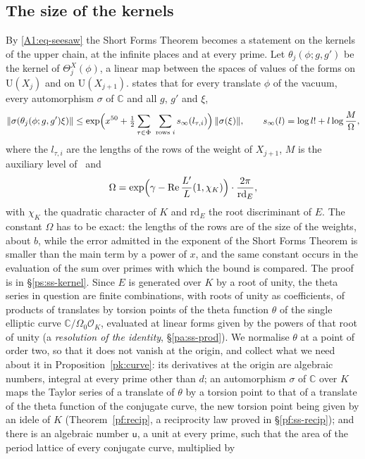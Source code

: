 \documentclass[10pt]{amsart}
\theoremstyle{definition}
\theoremstyle{remark}
\newcommand{\C}{\mathbb C}
\newcommand{\Rel}{\operatorname{Re}}
\providecommand{\auO}{\mathcal O}
\providecommand{\auPl}{\Phi}
\providecommand{\auU}{\mathrm U}
\providecommand{\auchi}{\chi_K}
\providecommand{\aurd}{\mathrm{rd}_E}
\providecommand{\ausinf}{s_\infty}
\begin{document}
\subsection*{The size of the kernels}
By \eqref{A1:eq-seesaw} the Short Forms Theorem becomes a statement on the kernels of the upper
chain, at the infinite places and at every prime. Let $\theta_j(\phi;g,g')$ be the kernel of
$\Theta^X_j(\phi)$, a linear map between the spaces of values of the forms on $\auU(X_j)$ and on
$\auU(X_{j+1})$. {\cite[Proposition~14.23]{P46}} states that for every translate $\phi$ of the
vacuum, every automorphism $\sigma$ of $\C$ and all $g$, $g'$ and $\xi$,
\[
\|\sigma(\theta_j(\phi;g,g')\xi)\|\le\exp\Bigl(x^{50}+\tfrac12\sum_{\tau\in\auPl}\
\sum_{\text{rows }i}\ausinf(l_{\tau,i})\Bigr)\,\|\sigma(\xi)\|,\qquad
\ausinf(l)=\log l!+l\log\frac M\Omega,
\]
where the $l_{\tau,i}$ are the lengths of the rows of the weight of $X_{j+1}$, $M$ is the
auxiliary level of~\cite{P46} and
\[
\Omega=\exp\Bigl(\gamma-\Rel\frac{L'}{L}(1,\auchi)\Bigr)\cdot\frac{2\pi}{\aurd},
\]
with $\auchi$ the quadratic character of $K$ and $\aurd$ the root discriminant of $E$. The
constant $\Omega$ has to be exact: the lengths of the rows are of the size of the weights, about
$b$, while the error admitted in the exponent of the Short Forms Theorem is smaller than the main
term by a power of $x$, and the same constant occurs in the evaluation of the sum over primes with
which the bound is compared. The proof is in \S\ref{ps:ss-kernel}. Since $E$ is generated over $K$
by a root of unity, the theta series in question are finite combinations, with roots of unity as
coefficients, of products of translates by torsion points of the theta function $\theta$ of the
single elliptic curve $\C/\Omega_0\auO_K$, evaluated at linear forms given by the powers of that
root of unity (a \emph{resolution of the identity}, \S\ref{pa:ss-prod}). We normalise $\theta$ at a point of
order two, so that it does not vanish at the origin, and collect what we need about it in
Proposition~\ref{pk:curve}: its derivatives at the origin are algebraic numbers, integral at every prime
other than $d$; an automorphism $\sigma$ of $\C$ over $K$ maps the Taylor series of a translate of
$\theta$ by a torsion point to that of a translate of the theta function of the conjugate curve,
the new torsion point being given by an idele of $K$ (Theorem~\ref{pf:recip}, a reciprocity law
proved in \S\ref{pf:ss-recip}); and there is an algebraic number $\mathsf u$, a unit at every
prime, such that the area of the period lattice of every conjugate curve, multiplied by
\end{document}
